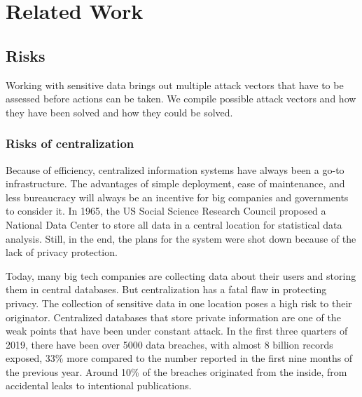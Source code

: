 
\chapter{Related Work}\label{chapter:relatedwork}
\section{Risks}
Working with sensitive data brings out multiple attack vectors that have to be assessed before actions can be taken. We compile possible attack vectors and how they have been solved and how they could be solved.

\subsection{Risks of centralization}
Because of efficiency, centralized information systems have always been a go-to infrastructure. The advantages of simple deployment, ease of maintenance, and less bureaucracy will always be an incentive for big companies and governments to consider it. In 1965, the US Social Science Research Council proposed a National Data Center to store all data in a central location for statistical data analysis. Still, in the end, the plans for the system were shot down because of the lack of privacy protection.

Today, many big tech companies are collecting data about their users and storing them in central databases. But centralization has a fatal flaw in protecting privacy. The collection of sensitive data in one location poses a high risk to their originator.
 Centralized databases that store private information are one of the weak points that have been under constant attack. In the first three quarters of 2019, there have been over 5000 data breaches, with almost 8 billion records exposed, 33\% more compared to the number reported in the first nine months of the previous year. Around 10\% of the breaches originated from the inside, from accidental leaks to intentional publications.


